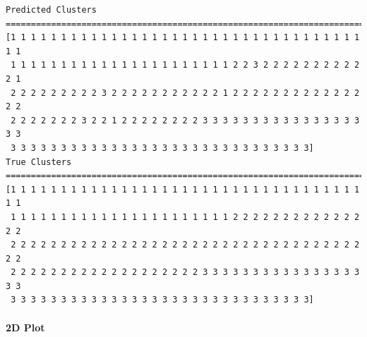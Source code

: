 \documentclass[11pt]{article}
\begin{document}
    \begin{Verbatim}[commandchars=\\\{\}]
Predicted Clusters
==========================================================================
[1 1 1 1 1 1 1 1 1 1 1 1 1 1 1 1 1 1 1 1 1 1 1 1 1 1 1 1 1 1 1 1 1 1 1 1 1
 1 1 1 1 1 1 1 1 1 1 1 1 1 1 1 1 1 1 1 1 1 1 2 2 3 2 2 2 2 2 2 2 2 2 2 2 1
 2 2 2 2 2 2 2 2 2 3 2 2 2 2 2 2 2 2 2 2 2 1 2 2 2 2 2 2 2 2 2 2 2 2 2 2 2
 2 2 2 2 2 2 2 3 2 2 1 2 2 2 2 2 2 2 2 3 3 3 3 3 3 3 3 3 3 3 3 3 3 3 3 3 3
 3 3 3 3 3 3 3 3 3 3 3 3 3 3 3 3 3 3 3 3 3 3 3 3 3 3 3 3 3 3]
True Clusters
==========================================================================
[1 1 1 1 1 1 1 1 1 1 1 1 1 1 1 1 1 1 1 1 1 1 1 1 1 1 1 1 1 1 1 1 1 1 1 1 1
 1 1 1 1 1 1 1 1 1 1 1 1 1 1 1 1 1 1 1 1 1 1 2 2 2 2 2 2 2 2 2 2 2 2 2 2 2
 2 2 2 2 2 2 2 2 2 2 2 2 2 2 2 2 2 2 2 2 2 2 2 2 2 2 2 2 2 2 2 2 2 2 2 2 2
 2 2 2 2 2 2 2 2 2 2 2 2 2 2 2 2 2 2 2 3 3 3 3 3 3 3 3 3 3 3 3 3 3 3 3 3 3
 3 3 3 3 3 3 3 3 3 3 3 3 3 3 3 3 3 3 3 3 3 3 3 3 3 3 3 3 3 3]
    \end{Verbatim}

    \hypertarget{d-plot}{%
\paragraph{2D Plot}\label{d-plot}}
\end{document}
